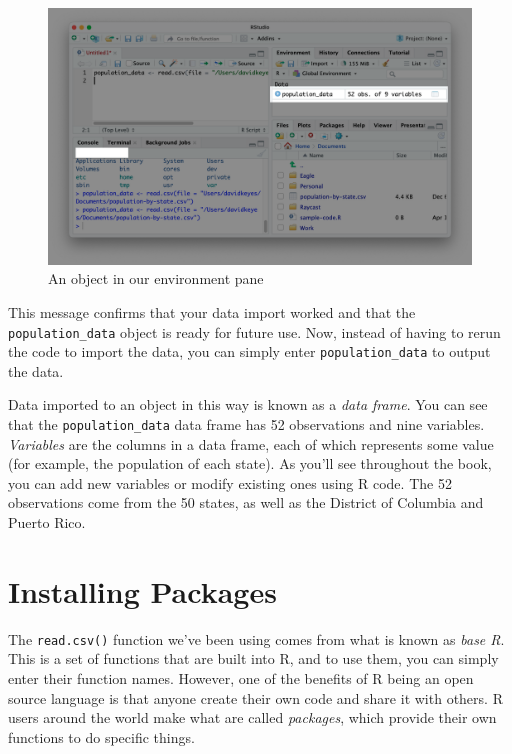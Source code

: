 \documentclass[
]{book}
\begin{document}
\begin{figure}
\includegraphics[width=1\linewidth]{assets/population-data-environment} \caption{An object in our environment pane}\label{fig:population-data-environment}
\end{figure}

This message confirms that your data import worked and that the \texttt{population\_data} object is ready for future use. Now, instead of having to rerun the code to import the data, you can simply enter \texttt{population\_data} to output the data.

Data imported to an object in this way is known as a \emph{data frame}. You can see that the \texttt{population\_data} data frame has 52 observations and nine variables. \emph{Variables} are the columns in a data frame, each of which represents some value (for example, the population of each state). As you'll see throughout the book, you can add new variables or modify existing ones using R code. The 52 observations come from the 50 states, as well as the District of Columbia and Puerto Rico.

\hypertarget{installing-packages}{%
\section*{Installing Packages}\label{installing-packages}}

The \texttt{read.csv()} function we've been using comes from what is known as \emph{base R}. This is a set of functions that are built into R, and to use them, you can simply enter their function names. However, one of the benefits of R being an open source language is that anyone create their own code and share it with others. R users around the world make what are called \emph{packages}, which provide their own functions to do specific things.
\end{document}
